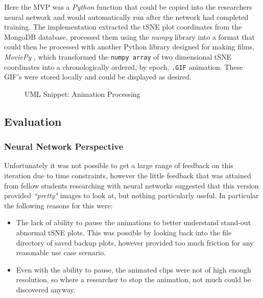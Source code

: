\documentclass[a4paper,11pt,titlepage]{article}
\begin{document}
	Here the MVP was a \textit{Python} function that could be copied into the researchers neural network and would automatically run after the network had completed training. The implementation extracted the tSNE plot coordinates from the MongoDB database, processed them using the \textit{numpy} library into a format that could then be processed with another Python library designed for making films, \textit{MoviePy} \cite{?}, which transformed the \texttt{numpy array} of two dimensional tSNE coordinates into a chronologically ordered, by epoch, \texttt{.GIF} animation. These GIF's were stored locally and could be displayed as desired.
	
	\begin{figure}[H]
    			\caption{UML Snippet: Animation Processing}%
	\end{figure}		

	
	\subsection{Evaluation}
		
	\subsubsection{Neural Network Perspective}
	Unfortunately it was not possible to get a large range of feedback on this iteration due to time constraints, however the little feedback that was attained from fellow students researching with neural networks suggested that this version provided \textit{``pretty"} images to look at, but nothing particularly useful. In particular the following reasons for this were:
		\begin{itemize}
			\item The lack of ability to pause the animations to better understand stand-out abnormal tSNE plots. This was possible by looking back into the file directory of saved backup plots, however provided too much friction for any reasonable use case scenario.
		\item Even with the ability to pause, the animated clips were not of high enough resolution, so where a researcher to stop the animation, not much could be discovered anyway.
		\end{itemize}
		
\end{document}
